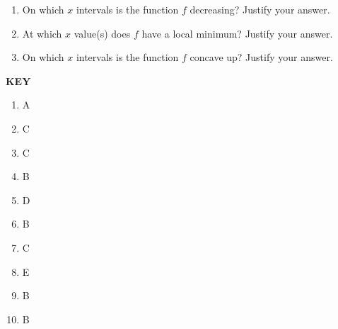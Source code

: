 \documentclass{article}
\begin{document}
\begin{enumerate}
	\setlength{\itemsep}{1in}
	\item On which $x$ intervals is the function $f$ decreasing? Justify your answer.
	\item At which $x$ value(s) does $f$ have a local minimum? Justify your answer.
	\item On which $x$ intervals is the function $f$ concave up? Justify your answer.
\end{enumerate}

\clearpage
\textbf{KEY}
\begin{enumerate}
	\item A
	\item C
	\item C
	\item B
	\item D
	\item B
	\item C
	\item E
	\item B
	\item B
\end{enumerate}
\end{document}
